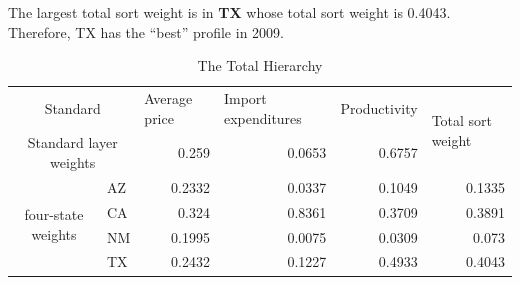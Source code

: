 \documentclass{mcmthesis}
\begin{document}
The largest total sort weight is in \textbf{TX} whose total sort weight is 0.4043. Therefore, TX has the “best” profile in 2009.
\begin{table}[h]
	\centering
	\caption{The Total Hierarchy}
	\label{my-label}
	\begin{tabular}{|c|l|r|r|r|r|}
		\hline
		\multicolumn{2}{|c|}{Standard}               & \multicolumn{1}{l|}{Average price} & \multicolumn{1}{l|}{Import expenditures} & \multicolumn{1}{l|}{Productivity} & \multicolumn{1}{l|}{\multirow{2}{*}{Total sort weight}} \\ \cline{1-5}
		\multicolumn{2}{|c|}{Standard layer weights} & 0.259                              & 0.0653                                   & 0.6757                            & \multicolumn{1}{l|}{}                                   \\ \hline
		\multirow{4}{*}{four-state weights}   & AZ   & 0.2332                             & 0.0337                                   & 0.1049                            & 0.1335                                                  \\ \cline{2-6} 
		& CA   & 0.324                              & 0.8361                                   & 0.3709                            & 0.3891                                                  \\ \cline{2-6} 
		& NM   & 0.1995                             & 0.0075                                   & 0.0309                            & 0.073                                                   \\ \cline{2-6} 
		& TX   & 0.2432                             & 0.1227                                   & 0.4933                            & 0.4043                                                  \\ \hline
	\end{tabular}
\end{table}
\end{document}
